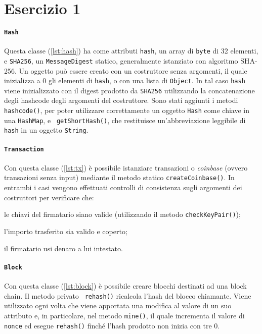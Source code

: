 \section{Esercizio 1}

\paragraph{\texttt{\textbf{Hash}}} Questa classe (\autoref{lst:hash}) ha come
attributi {\tt hash}, un array di {\tt byte} di 32 elementi, e {\tt SHA256}, un
{\tt MessageDigest} statico, generalmente istanziato con algoritmo SHA-256. Un
oggetto può essere creato con un costruttore senza argomenti, il quale
inizializza a 0 gli elementi di {\tt hash}, o con una lista di {\tt Object}. In
tal caso {\tt hash} viene inizializzato con il digest prodotto da {\tt SHA256}
utilizzando la concatenazione degli hashcode degli argomenti del costruttore.
Sono stati aggiunti i metodi {\tt hashcode()}, per poter utilizzare
correttamente un oggetto {\tt Hash} come chiave in una {\tt HashMap}, e {\tt
getShortHash()}, che restituisce un'abbreviazione leggibile di {\tt hash} in un
oggetto {\tt String}.

\paragraph{\texttt{\textbf{Transaction}}} Con questa classe (\autoref{lst:tx}) è
possibile istanziare transazioni o \emph{coinbase} (ovvero transazioni senza
input) mediante il metodo statico {\tt createCoinbase()}. In entrambi i casi
vengono effettuati controlli di consistenza sugli argomenti dei costruttori per
verificare che:
%
\begin{enumerate*}
  \item le chiavi del firmatario siano valide (utilizzando il metodo
  {\tt checkKeyPair()});
  \item l'importo trasferito sia valido e coperto;
  \item il firmatario usi denaro a lui intestato.
\end{enumerate*}

\paragraph{\texttt{\textbf{Block}}} Con questa classe (\autoref{lst:block}) è
possibile creare blocchi destinati ad una block chain. Il metodo privato {\tt
rehash()} ricalcola l'hash del blocco chiamante. Viene utilizzato ogni volta che
viene apportata una modifica al valore di un suo attributo e, in particolare,
nel metodo {\tt mine()}, il quale incrementa il valore di {\tt nonce} ed esegue
{\tt rehash()} finché l'hash prodotto non inizia con tre 0.
